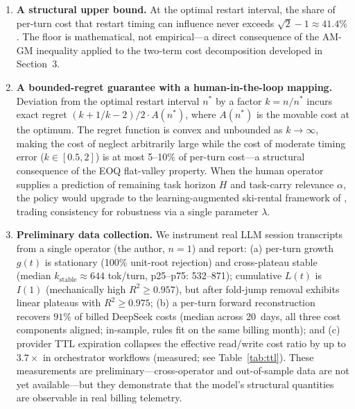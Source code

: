 \documentclass[11pt]{article}
\theoremstyle{definition}
\theoremstyle{remark}
\begin{document}
\begin{enumerate}[leftmargin=*,itemsep=0pt,topsep=0pt]
\item \textbf{A structural upper bound.} At the optimal restart interval, the share of per-turn cost that restart timing can influence never exceeds $\sqrt{2}-1 \approx 41.4\%$. The floor is mathematical, not empirical---a direct consequence of the AM-GM inequality applied to the two-term cost decomposition developed in Section~3.
\item \textbf{A bounded-regret guarantee with a human-in-the-loop mapping.} Deviation from the optimal restart interval $n^*$ by a factor $k = n/n^*$ incurs exact regret $(k + 1/k - 2)/2 \cdot A(n^*)$, where $A(n^*)$ is the movable cost at the optimum. The regret function is convex and unbounded as $k \to \infty$, making the cost of neglect arbitrarily large while the cost of moderate timing error ($k \in [0.5, 2]$) is at most 5--10\% of per-turn cost---a structural consequence of the EOQ flat-valley property. When the human operator supplies a prediction of remaining task horizon $H$ and task-carry relevance $\alpha$, the policy would upgrade to the learning-augmented ski-rental framework of \citet{purohit2018}, trading consistency for robustness via a single parameter $\lambda$.
\item \textbf{Preliminary data collection.} We instrument real LLM session transcripts from a single operator (the author, $n=1$) and report: (a) per-turn growth $g(t)$ is stationary (100\% unit-root rejection) and cross-plateau stable (median $k_{\text{stable}} \approx 644$ tok/turn, p25--p75: 532--871); cumulative $L(t)$ is $I(1)$ (mechanically high $R^2 \ge 0.957$), but after fold-jump removal exhibits linear plateaus with $R^2 \ge 0.975$; (b) a per-turn forward reconstruction recovers $91\%$ of billed DeepSeek costs (median across 20~days, all three cost components aligned; in-sample, rules fit on the same billing month); and (c) provider TTL expiration collapses the effective read/write cost ratio by up to $3.7\times$ in orchestrator workflows (measured; see Table~\ref{tab:ttl}). These measurements are preliminary---cross-operator and out-of-sample data are not yet available---but they demonstrate that the model's structural quantities are observable in real billing telemetry.
\end{enumerate}
\end{document}
